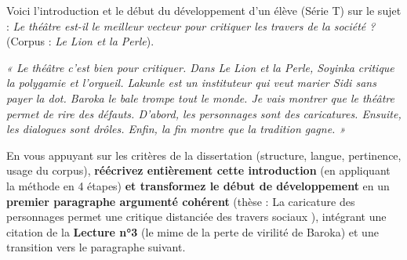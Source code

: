 \documentclass[11pt]{article}
\begin{document}
\begin{exercice}
Voici l'introduction et le début du développement d'un élève (Série T) sur le sujet : \og \textit{Le théâtre est-il le meilleur vecteur pour critiquer les travers de la société ?} \fg{} (Corpus : \textit{Le Lion et la Perle}).

\medskip
\noindent \textit{« Le théâtre c'est bien pour critiquer. Dans Le Lion et la Perle, Soyinka critique la polygamie et l'orgueil. Lakunle est un instituteur qui veut marier Sidi sans payer la dot. Baroka le bale trompe tout le monde. Je vais montrer que le théâtre permet de rire des défauts. D'abord, les personnages sont des caricatures. Ensuite, les dialogues sont drôles. Enfin, la fin montre que la tradition gagne. »}

\medskip
\noindent En vous appuyant sur les critères de la dissertation (structure, langue, pertinence, usage du corpus), \textbf{réécrivez entièrement cette introduction} (en appliquant la méthode en 4 étapes) \textbf{et transformez le début de développement} en un \textbf{premier paragraphe argumenté cohérent} (thèse : \og La caricature des personnages permet une critique distanciée des travers sociaux \fg{}), intégrant une citation de la \textbf{Lecture n°3} (le mime de la perte de virilité de Baroka) et une transition vers le paragraphe suivant.
\end{exercice}
\end{document}
